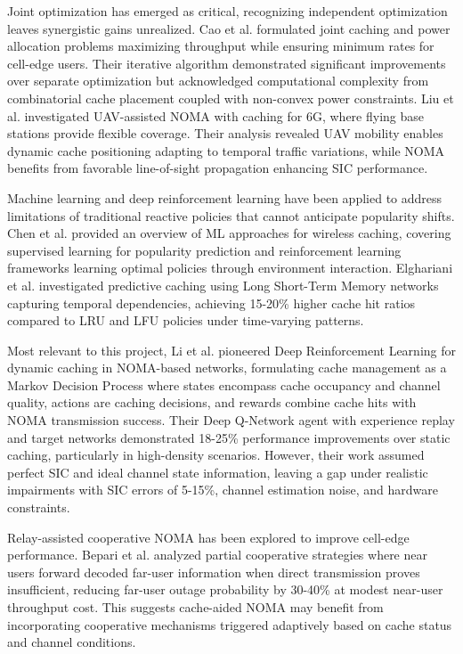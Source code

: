 \documentclass[12pt,a4paper]{article}
\begin{document}
Joint optimization has emerged as critical, recognizing independent optimization leaves synergistic gains unrealized. Cao et al. \cite{b_cao_joint} formulated joint caching and power allocation problems maximizing throughput while ensuring minimum rates for cell-edge users. Their iterative algorithm demonstrated significant improvements over separate optimization but acknowledged computational complexity from combinatorial cache placement coupled with non-convex power constraints. Liu et al. \cite{b_liu_uav} investigated UAV-assisted NOMA with caching for 6G, where flying base stations provide flexible coverage. Their analysis revealed UAV mobility enables dynamic cache positioning adapting to temporal traffic variations, while NOMA benefits from favorable line-of-sight propagation enhancing SIC performance.

Machine learning and deep reinforcement learning have been applied to address limitations of traditional reactive policies that cannot anticipate popularity shifts. Chen et al. \cite{b_chen_ml} provided an overview of ML approaches for wireless caching, covering supervised learning for popularity prediction and reinforcement learning frameworks learning optimal policies through environment interaction. Elghariani et al. \cite{b_elghariani_pred} investigated predictive caching using Long Short-Term Memory networks capturing temporal dependencies, achieving 15-20\% higher cache hit ratios compared to LRU and LFU policies under time-varying patterns.

Most relevant to this project, Li et al. \cite{b_li_drl} pioneered Deep Reinforcement Learning for dynamic caching in NOMA-based networks, formulating cache management as a Markov Decision Process where states encompass cache occupancy and channel quality, actions are caching decisions, and rewards combine cache hits with NOMA transmission success. Their Deep Q-Network agent with experience replay and target networks demonstrated 18-25\% performance improvements over static caching, particularly in high-density scenarios. However, their work assumed perfect SIC and ideal channel state information, leaving a gap under realistic impairments with SIC errors of 5-15\%, channel estimation noise, and hardware constraints.

Relay-assisted cooperative NOMA has been explored to improve cell-edge performance. Bepari et al. \cite{b_bepari_partial} analyzed partial cooperative strategies where near users forward decoded far-user information when direct transmission proves insufficient, reducing far-user outage probability by 30-40\% at modest near-user throughput cost. This suggests cache-aided NOMA may benefit from incorporating cooperative mechanisms triggered adaptively based on cache status and channel conditions.
\end{document}
